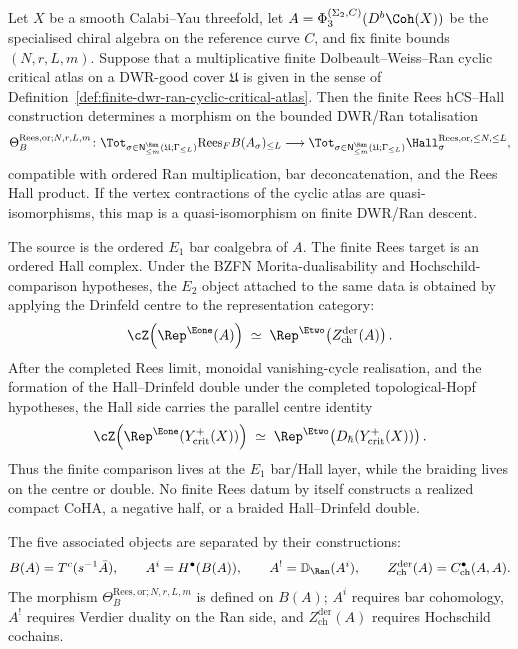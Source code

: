 \begin{proposition}
\label{prop:finite-dwr-ran-rees-e1-e2-hall}
Let $X$ be a smooth Calabi--Yau threefold, let
$A=\Phi_3^{(\Sigma_2,C)}(D^b\Coh(X))$ be the specialised chiral algebra
on the reference curve $C$, and fix finite bounds $(N,r,L,m)$. Suppose
that a multiplicative finite Dolbeault--Weiss--Ran cyclic critical
atlas on a DWR-good cover $\mathfrak U$ is given in the sense of
Definition~\ref{def:finite-dwr-ran-cyclic-critical-atlas}. Then the
finite Rees hCS--Hall construction determines a morphism on the bounded
DWR/Ran totalisation
\[
 \Theta_{B}^{\mathrm{Rees},\mathrm{or};N,r,L,m}\colon
 \Tot_{\sigma\in\mathsf N^{\Ran}_{\le m}(\mathfrak U;\Gamma_{\le L})}
 \mathrm{Rees}_{F}B(A_\sigma)_{\le L}
 \longrightarrow
 \Tot_{\sigma\in\mathsf N^{\Ran}_{\le m}(\mathfrak U;\Gamma_{\le L})}
 \Hall_{\sigma}^{\mathrm{Rees},\mathrm{or},\le N,\le L},
\]
compatible with ordered Ran multiplication, bar deconcatenation, and
the Rees Hall product. If the vertex contractions of the cyclic atlas
are quasi-isomorphisms, this map is a quasi-isomorphism on finite
DWR/Ran descent.

The source is the ordered $E_1$ bar coalgebra of $A$. The finite Rees
target is an ordered Hall complex. Under the BZFN Morita-dualisability
and Hochschild-comparison hypotheses, the $E_2$ object attached to the
same data is obtained by applying the Drinfeld centre to the
representation category:
\[
 \cZ\!\left(\Rep^{\Eone}(A)\right)
 \;\simeq\;
 \Rep^{\Etwo}\!\left(Z^{\mathrm{der}}_{\mathrm{ch}}(A)\right).
\]
After the completed Rees limit, monoidal vanishing-cycle realisation,
and the formation of the Hall--Drinfeld double under the completed
topological-Hopf hypotheses, the Hall side carries the parallel centre identity
\[
 \cZ\!\left(\Rep^{\Eone}(Y^+_{\mathrm{crit}}(X))\right)
 \;\simeq\;
 \Rep^{\Etwo}\!\left(D_\hbar(Y^+_{\mathrm{crit}}(X))\right).
\]
Thus the finite comparison lives at the $E_1$ bar/Hall layer, while the
braiding lives on the centre or double. No finite Rees datum by itself
constructs a realized compact CoHA, a negative half, or a braided
Hall--Drinfeld double.

The five associated objects are separated by their constructions:
\[
 B(A)=T^c(s^{-1}\bar A),\qquad
 A^i=H^\bullet(B(A)),\qquad
 A^!=\mathbb D_{\Ran}(A^i),\qquad
 Z^{\mathrm{der}}_{\mathrm{ch}}(A)=C^\bullet_{\mathrm{ch}}(A,A).
\]
The morphism $\Theta_B^{\mathrm{Rees},\mathrm{or};N,r,L,m}$ is defined
on $B(A)$; $A^i$ requires bar cohomology, $A^!$ requires Verdier duality
on the Ran side, and $Z^{\mathrm{der}}_{\mathrm{ch}}(A)$ requires
Hochschild cochains.
\end{proposition}

